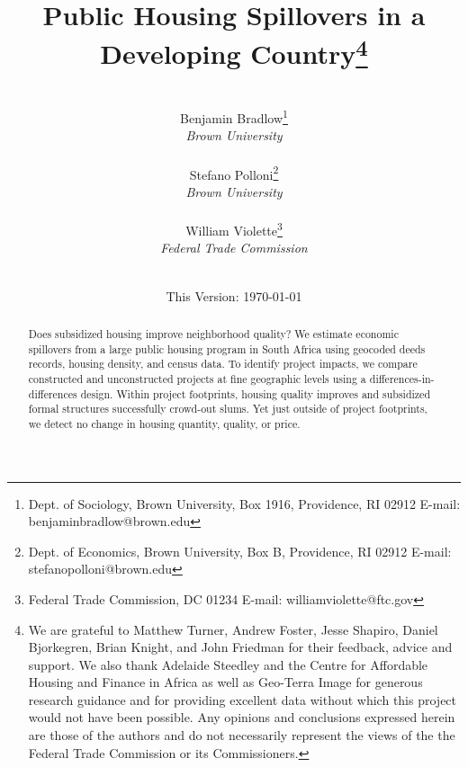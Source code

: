 \documentclass[12pt]{article}
\begin{document}
\begin{titlepage}
\title{Public Housing Spillovers in a Developing Country\thanks{We are grateful to Matthew Turner, Andrew Foster, Jesse Shapiro, Daniel Bjorkegren, Brian Knight, and John Friedman for their feedback, advice and support.  We also thank Adelaide Steedley and the Centre for Affordable Housing and Finance in Africa as well as Geo-Terra Image for generous research guidance and for providing excellent data without which this project would not have been possible.  Any opinions and conclusions expressed herein are those of the authors and do not necessarily represent the views of the the Federal Trade Commission or its Commissioners.}}
\author{\\ Benjamin Bradlow\thanks{Dept. of Sociology, Brown University, Box 1916, Providence, RI 02912  E-mail: benjamin\textunderscore bradlow@brown.edu}\\[-0.4em] \normalsize{\it Brown University}\\
 \\ 
 Stefano Polloni\thanks{Dept. of Economics, Brown University, Box B, Providence, RI 02912  E-mail: stefano\textunderscore polloni@brown.edu}\\[-0.4em] \normalsize{\it Brown University}\\ 
 \\
  William Violette\thanks{Federal Trade Commission, DC 01234  E-mail: william\textunderscore violette@ftc.gov} \\[-0.4em] \normalsize{\it Federal Trade Commission}\\
 \\ 
  }
\vspace{30mm}
\date{\vspace{5mm}This Version: \today}
\maketitle
\begin{abstract}

	Does subsidized housing improve neighborhood quality? We estimate economic spillovers from a large public housing program in South Africa using geocoded deeds records, housing density, and census data.  To identify project impacts, we compare constructed and unconstructed projects at fine geographic levels using a differences-in-differences design.  Within project footprints, housing quality improves and subsidized formal structures successfully crowd-out slums. Yet just outside of project footprints, we detect no change in housing quantity, quality, or price. 

\bigskip
\end{abstract}
\setcounter{page}{0}
\thispagestyle{empty}
\end{titlepage}
\pagebreak \newpage
\end{document}
